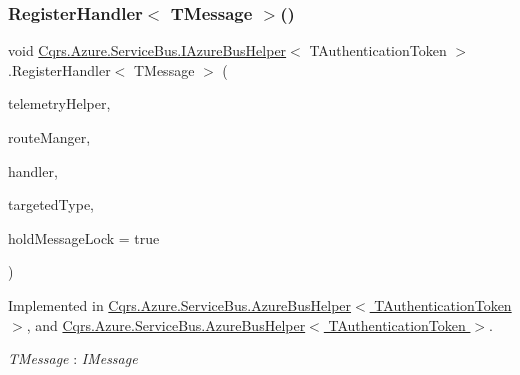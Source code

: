 \subsubsection{\texorpdfstring{Register\+Handler$<$ T\+Message $>$()}{RegisterHandler< TMessage >()}}
{\footnotesize\ttfamily void \hyperlink{interfaceCqrs_1_1Azure_1_1ServiceBus_1_1IAzureBusHelper}{Cqrs.\+Azure.\+Service\+Bus.\+I\+Azure\+Bus\+Helper}$<$ T\+Authentication\+Token $>$.Register\+Handler$<$ T\+Message $>$ (\begin{DoxyParamCaption}\item[{I\+Telemetry\+Helper}]{telemetry\+Helper,  }\item[{\hyperlink{classCqrs_1_1Bus_1_1RouteManager}{Route\+Manager}}]{route\+Manger,  }\item[{Action$<$ T\+Message $>$}]{handler,  }\item[{Type}]{targeted\+Type,  }\item[{bool}]{hold\+Message\+Lock = {\ttfamily true} }\end{DoxyParamCaption})}



Implemented in \hyperlink{classCqrs_1_1Azure_1_1ServiceBus_1_1AzureBusHelper_a3b8dd8410756ffdc67782dde8f2519ff}{Cqrs.\+Azure.\+Service\+Bus.\+Azure\+Bus\+Helper$<$ T\+Authentication\+Token $>$}, and \hyperlink{classCqrs_1_1Azure_1_1ServiceBus_1_1AzureBusHelper_a3b8dd8410756ffdc67782dde8f2519ff}{Cqrs.\+Azure.\+Service\+Bus.\+Azure\+Bus\+Helper$<$ T\+Authentication\+Token $>$}.

\begin{Desc}
\item[Type Constraints]\begin{description}
\item[{\em T\+Message} : {\em I\+Message}]\end{description}
\end{Desc}
